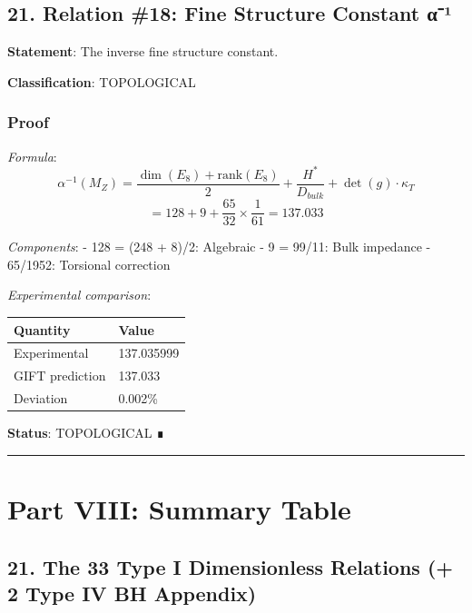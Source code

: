 \documentclass[11pt,a4paper]{article}
\begin{document}
\subsection{21. Relation \#18: Fine Structure Constant α⁻¹}\label{relation-18-fine-structure-constant-ux3b1uxb9}

\textbf{Statement}: The inverse fine structure constant.

\textbf{Classification}: TOPOLOGICAL

\subsubsection{Proof}\label{proof-28}

\emph{Formula}:
\[\alpha^{-1}(M_Z) = \frac{\dim(E_8) + \text{rank}(E_8)}{2} + \frac{H^*}{D_{bulk}} + \det(g) \cdot \kappa_T\]
\[= 128 + 9 + \frac{65}{32} \times \frac{1}{61} = 137.033\]

\emph{Components}:
- 128 = (248 + 8)/2: Algebraic
- 9 = 99/11: Bulk impedance
- 65/1952: Torsional correction

\emph{Experimental comparison}:

{\def\LTcaptype{none} %
\begin{longtable}[]{@{}ll@{}}
\toprule\noalign{}
Quantity & Value \\
\midrule\noalign{}
\endhead
\bottomrule\noalign{}
\endlastfoot
Experimental & 137.035999 \\
GIFT prediction & 137.033 \\
Deviation & 0.002\% \\
\end{longtable}
}

\textbf{Status}: TOPOLOGICAL ∎

\begin{center}\rule{0.5\linewidth}{0.5pt}\end{center}

\section{Part VIII: Summary Table}\label{part-viii-summary-table}

\subsection{21. The 33 Type I Dimensionless Relations (+ 2 Type IV BH Appendix)}\label{the-33-type-i-dimensionless-relations-2-type-iv-bh-appendix}
\end{document}
